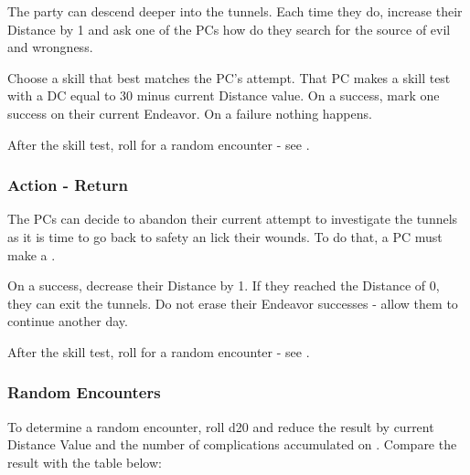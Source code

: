 The party can descend deeper into the tunnels. Each time they do, increase their Distance by 1 and ask one of the PCs how do they search for the source of evil and wrongness. 

Choose a skill that best matches the PC's attempt. That PC makes a skill test with a DC equal to 30 minus current Distance value. On a success, mark one success on their current Endeavor. On a failure nothing happens.

After the skill test, roll for a random encounter - see .


\subsubsection{Action - Return}

The PCs can decide to abandon their current attempt to investigate the tunnels as it is time to go back to safety an lick their wounds. To do that, a PC must make a .

On a success, decrease their Distance by 1. If they reached the Distance of 0, they can exit the tunnels. Do not erase their Endeavor successes - allow them to continue another day.

After the skill test, roll for a random encounter - see .

\subsubsection{Random Encounters}
\label{ssec:darkTunnelsEncounters}

To determine a random encounter, roll d20 and reduce the result by current Distance Value and the number of complications accumulated on . Compare the result with the table below: \\

